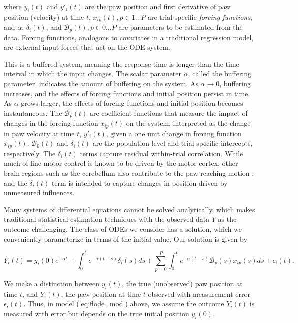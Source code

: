 \documentclass[preprint]{JASA}
\begin{document}
\noindent where \(y_i(t)\) and \(y'_i(t)\) are the paw position and
first derivative of paw position (velocity) at time \(t\),
\(x_{ip}(t), p \in 1\ldots P\) are trial-specific \emph{forcing
functions}, and \(\alpha\), \(\delta_i(t)\), and
\(\mathcal{B}_p(t), p\in 0\ldots P\) are parameters to be estimated from
the data. Forcing functions, analogous to covariates in a traditional
regression model, are external input forces that act on the ODE system.

This is a buffered system, meaning the response time is longer than the
time interval in which the input changes. The scalar parameter
\(\alpha\), called the buffering parameter, indicates the amount of
buffering on the system. As \(\alpha \to 0\), buffering increases, and
the effects of forcing functions and initial position persist in time.
As \(\alpha\) grows larger, the effects of forcing functions and initial
position becomes instantaneous. The \(\mathcal{B}_p(t)\) are coefficient
functions that measure the impact of changes in the forcing function
\(x_{ip}(t)\) on the system, interpreted as the change in paw velocity
at time \(t\), \(y'_i(t)\), given a one unit change in forcing function
\(x_{ip}(t)\). \(\mathcal{B}_0(t)\) and \(\delta_i(t)\) are the
population-level and trial-specific intercepts, respectively. The
\(\delta_i(t)\) terms capture residual within-trial correlation. While
much of fine motor control is known to be driven by the motor cortex,
other brain regions such as the cerebellum also contribute to the paw
reaching motion \citep{becker2020}, and the \(\delta_i(t)\) term is
intended to capture changes in position driven by unmeasured influences.

Many systems of differential equations cannot be solved analytically,
which makes traditional statistical estimation techniques with the
observed data \(Y\) as the outcome challenging. The class of ODEs we
consider has a solution, which we conveniently parameterize in terms of
the initial value. Our solution is given by

\begin{equation}
\label{eq:flode_mod}    
    Y_i(t) = y_i(0)e^{-\alpha t} + \int_0^t e^{-\alpha (t-s)}\delta_i(s)ds + \sum_{p=0}^P\int_0^t e^{-\alpha (t-s)} \mathcal{B}_p(s)x_{ip}(s)ds + \epsilon_i(t).
\end{equation}

\noindent We make a distinction between \(y_i(t)\), the true
(unobserved) paw position at time \(t\), and \(Y_i(t)\), the paw
position at time \(t\) observed with measurement error
\(\epsilon_i(t)\). Thus, in model (\ref{eq:flode_mod}) above, we assume
the outcome \(Y_i(t)\) is measured with error but depends on the true
initial position \(y_i(0)\).
\end{document}
